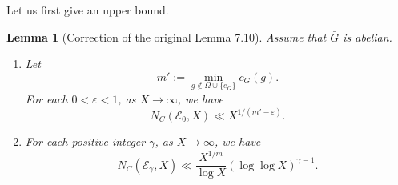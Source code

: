 \documentclass{amsart}
\numberwithin{equation}{section}
\theoremstyle{plain}
\newtheorem{lemma}[theorem]{Lemma}
\theoremstyle{definition}
\theoremstyle{remark}
\begin{document}
Let us first give an upper bound.
\begin{lemma}[Correction of the original Lemma 7.10]\label{lemma: estimate for upper bound}
	Assume that $\bar{G}$ is abelian.
	\begin{enumerate}
		\item Let
		\begin{equation*}
			m':=\min_{g\notin\Omega\cup\{e_G\}}c_G(g).
		\end{equation*}
		For each $0<\varepsilon<1$, as $X\to\infty$, we have 
		\begin{equation*}
			N_C(\mathcal{E}_0,X)\ll X^{1/(m'-\varepsilon)}.
		\end{equation*}
		\item For each positive integer $\gamma$, as $X\to\infty$, we have
		\begin{equation*}
			N_{C}(\mathcal{E}_{\gamma},X)\ll\frac{X^{1/m}}{\log X}(\log\log X)^{\gamma-1}.
		\end{equation*}		
	\end{enumerate}
\end{lemma}
\end{document}
